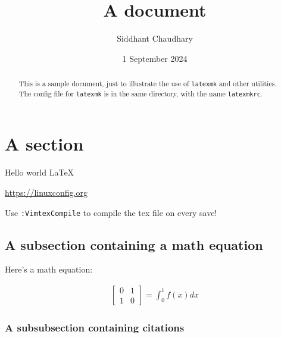 \documentclass{article}
\begin{document}
\title{A document}
\author{Siddhant Chaudhary}
\date{1 September 2024}
\maketitle
\begin{abstract}
    This is a sample document, just to illustrate the use of \texttt{latexmk} and other utilities. The config file for \texttt{latexmk} is in the same directory, with the name \texttt{latexmkrc}.
\end{abstract}

\section{A section}

Hello world \LaTeX

\url{https://linuxconfig.org}

Use \texttt{:VimtexCompile} to compile the tex file on every save!

\subsection{A subsection containing a math equation}

Here's a math equation: 

\begin{align*}
    \begin{bmatrix}
        0 & 1\\
        1 & 0
    \end{bmatrix} = \int_0^1 f(x)dx
\end{align*}

\subsubsection{A subsubsection containing citations}
\cite{mansour2013complexity}



\end{document}
